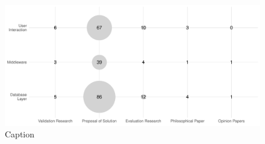 \begin{figure}[hptb]
    \centering
    \includegraphics[width=\textwidth]{images/2_mapping/layer_vs_type}
    \caption{Caption}
    \label{Layer vs Research type}\label{fig:mapping/layer_vs_type}
\end{figure}

